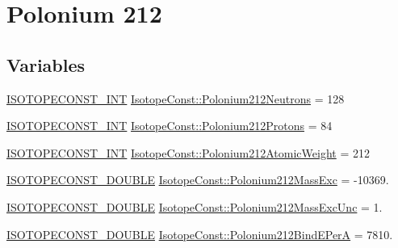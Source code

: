 \hypertarget{group___isotope_const-_polonium-_po212}{}\section{Polonium 212}
\label{group___isotope_const-_polonium-_po212}
\subsection*{Variables}
\begin{DoxyCompactItemize}
\item 
\mbox{\hyperlink{group___isotope_const-_macros_ga5f18360b3e99483a35c32d789e62621c}{I\+S\+O\+T\+O\+P\+E\+C\+O\+N\+S\+T\+\_\+\+I\+NT}} \mbox{\hyperlink{group___isotope_const-_polonium-_po212_gaa916327aff13f9fdb0c9649dc3533b51}{Isotope\+Const\+::\+Polonium212\+Neutrons}} = 128
\item 
\mbox{\hyperlink{group___isotope_const-_macros_ga5f18360b3e99483a35c32d789e62621c}{I\+S\+O\+T\+O\+P\+E\+C\+O\+N\+S\+T\+\_\+\+I\+NT}} \mbox{\hyperlink{group___isotope_const-_polonium-_po212_gaa10b4c0c62d0e345e3ee13a9b105b231}{Isotope\+Const\+::\+Polonium212\+Protons}} = 84
\item 
\mbox{\hyperlink{group___isotope_const-_macros_ga5f18360b3e99483a35c32d789e62621c}{I\+S\+O\+T\+O\+P\+E\+C\+O\+N\+S\+T\+\_\+\+I\+NT}} \mbox{\hyperlink{group___isotope_const-_polonium-_po212_gaceef7c4660d054ac83d2ba0ff964f48a}{Isotope\+Const\+::\+Polonium212\+Atomic\+Weight}} = 212
\item 
\mbox{\hyperlink{group___isotope_const-_macros_ga8f45a7272ce02c0b4c65c44636ed719a}{I\+S\+O\+T\+O\+P\+E\+C\+O\+N\+S\+T\+\_\+\+D\+O\+U\+B\+LE}} \mbox{\hyperlink{group___isotope_const-_polonium-_po212_ga3db0cef7464b4de28cf2668ef6c95230}{Isotope\+Const\+::\+Polonium212\+Mass\+Exc}} = -\/10369.
\item 
\mbox{\hyperlink{group___isotope_const-_macros_ga8f45a7272ce02c0b4c65c44636ed719a}{I\+S\+O\+T\+O\+P\+E\+C\+O\+N\+S\+T\+\_\+\+D\+O\+U\+B\+LE}} \mbox{\hyperlink{group___isotope_const-_polonium-_po212_ga8760d4272fa8078d3e9d256db9de3ea0}{Isotope\+Const\+::\+Polonium212\+Mass\+Exc\+Unc}} = 1.
\item 
\mbox{\hyperlink{group___isotope_const-_macros_ga8f45a7272ce02c0b4c65c44636ed719a}{I\+S\+O\+T\+O\+P\+E\+C\+O\+N\+S\+T\+\_\+\+D\+O\+U\+B\+LE}} \mbox{\hyperlink{group___isotope_const-_polonium-_po212_ga28efac5e937b611e9b92b23c3d649181}{Isotope\+Const\+::\+Polonium212\+Bind\+E\+PerA}} = 7810.
\item 

\end{DoxyCompactItemize}
